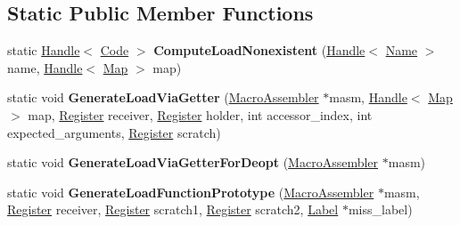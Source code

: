\subsection*{Static Public Member Functions}
\begin{DoxyCompactItemize}
\item 
static \hyperlink{classv8_1_1internal_1_1_handle}{Handle}$<$ \hyperlink{classv8_1_1internal_1_1_code}{Code} $>$ {\bfseries Compute\+Load\+Nonexistent} (\hyperlink{classv8_1_1internal_1_1_handle}{Handle}$<$ \hyperlink{classv8_1_1internal_1_1_name}{Name} $>$ name, \hyperlink{classv8_1_1internal_1_1_handle}{Handle}$<$ \hyperlink{classv8_1_1internal_1_1_map}{Map} $>$ map)\hypertarget{classv8_1_1internal_1_1_named_load_handler_compiler_a87ec8d9d42adcd303ea06fb499c82c7a}{}\label{classv8_1_1internal_1_1_named_load_handler_compiler_a87ec8d9d42adcd303ea06fb499c82c7a}

\item 
static void {\bfseries Generate\+Load\+Via\+Getter} (\hyperlink{classv8_1_1internal_1_1_macro_assembler}{Macro\+Assembler} $\ast$masm, \hyperlink{classv8_1_1internal_1_1_handle}{Handle}$<$ \hyperlink{classv8_1_1internal_1_1_map}{Map} $>$ map, \hyperlink{structv8_1_1internal_1_1_register}{Register} receiver, \hyperlink{structv8_1_1internal_1_1_register}{Register} holder, int accessor\+\_\+index, int expected\+\_\+arguments, \hyperlink{structv8_1_1internal_1_1_register}{Register} scratch)\hypertarget{classv8_1_1internal_1_1_named_load_handler_compiler_a46c02fa664971431dde0cbe8c22815b6}{}\label{classv8_1_1internal_1_1_named_load_handler_compiler_a46c02fa664971431dde0cbe8c22815b6}

\item 
static void {\bfseries Generate\+Load\+Via\+Getter\+For\+Deopt} (\hyperlink{classv8_1_1internal_1_1_macro_assembler}{Macro\+Assembler} $\ast$masm)\hypertarget{classv8_1_1internal_1_1_named_load_handler_compiler_a2dabd036a1b57ba6f3922fa97bb3923c}{}\label{classv8_1_1internal_1_1_named_load_handler_compiler_a2dabd036a1b57ba6f3922fa97bb3923c}

\item 
static void {\bfseries Generate\+Load\+Function\+Prototype} (\hyperlink{classv8_1_1internal_1_1_macro_assembler}{Macro\+Assembler} $\ast$masm, \hyperlink{structv8_1_1internal_1_1_register}{Register} receiver, \hyperlink{structv8_1_1internal_1_1_register}{Register} scratch1, \hyperlink{structv8_1_1internal_1_1_register}{Register} scratch2, \hyperlink{classv8_1_1internal_1_1_label}{Label} $\ast$miss\+\_\+label)\hypertarget{classv8_1_1internal_1_1_named_load_handler_compiler_ab1e2b4faf9bb03146129d2dfce125fb2}{}\label{classv8_1_1internal_1_1_named_load_handler_compiler_ab1e2b4faf9bb03146129d2dfce125fb2}

\end{DoxyCompactItemize}
